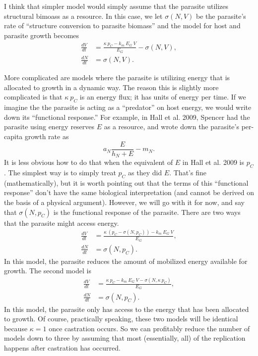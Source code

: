 \documentclass[12pt,reqno,final,pdftex]{amsart}\usepackage[]{graphicx}\usepackage[]{color}
\theoremstyle{plain}
\numberwithin{equation}{part}
\begin{document}
I think that simpler model would simply assume that the parasite utilizes structural bimoass as a resource.
In this case, we let $\sigma(N,V)$ be the parasite's rate of ``structure conversion to parasite biomass'' and the model for host and parasite growth becomes
\begin{align}
\frac{dV}{dt} &= \frac{\kappa~p_C - k_m~E_G~V }{E_G} - \sigma(N,V), \\
\frac{dN}{dt} &= \sigma(N,V).
\end{align}

More complicated are models where the parasite is utilizing energy that is allocated to growth in a dynamic way.
The reason this is slightly more complicated is that $\kappa~p_C$ is an energy flux; it has units of energy per time.
If we imagine the the parasite is acting as a ``predator'' on host energy, we would write down its ``functional response.''
For example, in Hall et al. 2009, Spencer had the parasite using energy reserves $E$ as a resource, and wrote down the parasite's per-capita growth rate as
\begin{equation}
a_N \frac{E}{h_N+E}-m_N.
\end{equation}
It is less obvious how to do that when the equivalent of $E$ in Hall et al. 2009 is $p_C$.
The simplest way is to simply treat $p_C$ as they did $E$.
That's fine (mathematically), but it is worth pointing out that the terms of this ``functional response'' don't have the same biological interpretation (and cannot be derived on the basis of a physical argument).
However, we will go with it for now, and say that $\sigma(N,p_C)$ is the functional response of the parasite.
There are two ways that the parasite might access energy.
\begin{align}
\frac{dV}{dt} &= \frac{\kappa~(p_C - \sigma(N,p_C)) - k_m~E_G~V}{E_G}, \\
\frac{dN}{dt} &= \sigma(N,p_C).
\end{align}
In this model, the parasite reduces the amount of mobilized energy available for growth.
The second model is
\begin{align}
\frac{dV}{dt} &= \frac{\kappa~p_C - k_m~E_G~V - \sigma(N,\kappa~p_C)}{E_G}, \\
\frac{dN}{dt} &= \sigma(N,p_C).
\end{align}
In this model, the parasite only has access to the energy that has been allocated to growth.
Of course, practically speaking, these two models will be identical because $\kappa=1$ once castration occurs.
So we can profitably reduce the number of models down to three by assuming that most (essentially, all) of the replication happens after castration has occurred.
\end{document}
